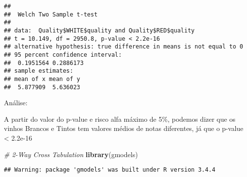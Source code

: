 \documentclass[]{article}
\newenvironment{Shaded}{\begin{snugshade}}{\end{snugshade}}
\newcommand{\KeywordTok}[1]{\textcolor[rgb]{0.13,0.29,0.53}{\textbf{#1}}}
\newcommand{\CommentTok}[1]{\textcolor[rgb]{0.56,0.35,0.01}{\textit{#1}}}
\newcommand{\OperatorTok}[1]{\textcolor[rgb]{0.81,0.36,0.00}{\textbf{#1}}}
\newcommand{\NormalTok}[1]{#1}
\begin{document}
\begin{verbatim}
## 
##  Welch Two Sample t-test
## 
## data:  Quality$WHITE$quality and Quality$RED$quality
## t = 10.149, df = 2950.8, p-value < 2.2e-16
## alternative hypothesis: true difference in means is not equal to 0
## 95 percent confidence interval:
##  0.1951564 0.2886173
## sample estimates:
## mean of x mean of y 
##  5.877909  5.636023
\end{verbatim}

Análise:

A partir do valor do p-value e risco alfa máximo de 5\%, podemos dizer
que os vinhos Brancos e Tintos tem valores médios de notas diferentes,
já que o p-value \textless{} 2.2e-16

\begin{Shaded}
\begin{Highlighting}[]
\CommentTok{# 2-Way Cross Tabulation}
\KeywordTok{library}\NormalTok{(gmodels)}
\end{Highlighting}
\end{Shaded}

\begin{verbatim}
## Warning: package 'gmodels' was built under R version 3.4.4
\end{verbatim}

\begin{Shaded}
\end{Shaded}
\end{document}
